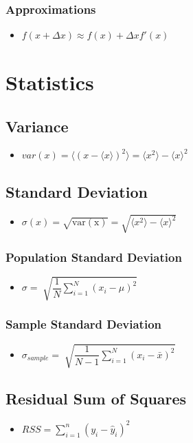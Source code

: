 \documentclass[]{report}
\newcommand \tab[1][1cm]{\hspace*{#1}}
\newcommand{\itemt}{\item \tab}
\begin{document}
\subsection{Approximations}
\begin{itemize}
\itemt \( f(x+\Delta x) \approx f(x) + \Delta x f'(x) \)
\end{itemize}


\chapter{Statistics}



	\section{Variance}
\begin{itemize}
\itemt \( var(x) = \langle (x - \langle x \rangle)^2 \rangle =\langle x^2 \rangle - \langle x \rangle^2 \)
\end{itemize}		


	\section{Standard Deviation}
\begin{itemize}
\itemt \( \sigma(x) = \sqrt{\mathrm{var(x)}} = \sqrt{\langle x^2 \rangle - \langle x \rangle^2} \)
\end{itemize}

		\subsection{Population Standard Deviation}
\begin{itemize}
\itemt \( \sigma = \sqrt[]{\dfrac{1}{N} \sum\limits^N_{i=1}(x_i - \mu)^2} \)
\end{itemize}

		\subsection{Sample Standard Deviation}
\begin{itemize}
\itemt \( \sigma_{sample} = \sqrt[]{\dfrac{1}{N-1} \sum\limits^N_{i=1}(x_i - \bar{x})^2} \)
\end{itemize}

	\section{Residual Sum of Squares}
\begin{itemize}
\itemt \( RSS = \sum\limits_{i=1}^n (y_i - \hat{y}_i)^2 \)
\end{itemize}
\end{document}
